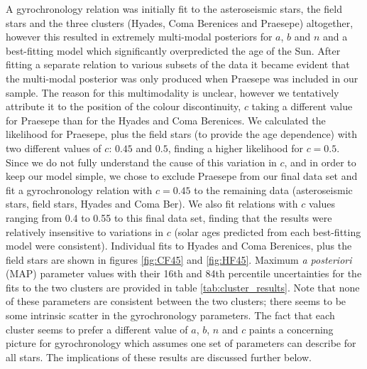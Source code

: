 \documentclass[10pt,preprint]{aastex}
\begin{document}
A gyrochronology relation was initially fit to the asteroseismic stars, the field stars and the three clusters (Hyades, Coma Berenices and Praesepe) altogether, however this resulted in extremely multi-modal posteriors for $a$, $b$ and $n$ and a best-fitting model which significantly overpredicted the age of the Sun.
After fitting a separate relation to various subsets of the data it became evident that the multi-modal posterior was only produced when Praesepe was included in our sample.
The reason for this multimodality is unclear, however we tentatively attribute it to the position of the colour discontinuity, $c$ taking a different value for Praesepe than for the Hyades and Coma Berenices.
We calculated the likelihood for Praesepe, plus the field stars (to provide the age dependence) with two different values of $c$: $0.45$ and $0.5$, finding a higher likelihood for $c=0.5$.
Since we do not fully understand the cause of this variation in $c$, and in order to keep our model simple, we chose to exclude Praesepe from our final data set and fit a gyrochronology relation with $c=0.45$ to the remaining data (asteroseismic stars, field stars, Hyades and Coma Ber).
We also fit relations with $c$ values ranging from 0.4 to 0.55 to this final data set, finding that the results were relatively insensitive to variations in $c$ (solar ages predicted from each best-fitting model were consistent).
Individual fits to Hyades and Coma Berenices, plus the field stars are shown in figures \ref{fig:CF45} and \ref{fig:HF45}.
Maximum {\it a posteriori} (MAP) parameter values with their 16th and 84th percentile uncertainties for the fits to the two clusters are provided in table \ref{tab:cluster_results}.
Note that none of these parameters are consistent between the two clusters; there seems to be some intrinsic scatter in the gyrochronology parameters.
The fact that each cluster seems to prefer a different value of $a$, $b$, $n$ and $c$ paints a concerning picture for gyrochronology which assumes one set of parameters can describe for all stars. The implications of these results are discussed further below.
\end{document}
